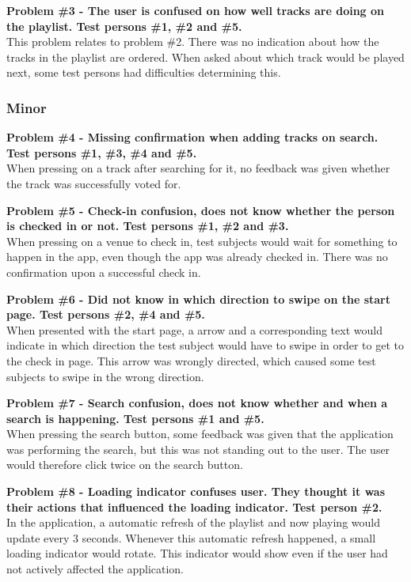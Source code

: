 \noindent\textbf{Problem \#3 - The user is confused on how well tracks are doing on the
    playlist. Test persons \#1, \#2 and \#5.}\\
  This problem relates to problem \#2. There was no indication about
  how the tracks in the playlist are ordered. When asked about which
  track would be played next, some test persons had difficulties
  determining this.

\subsubsection{Minor}
\textbf{Problem \#4 - Missing confirmation when adding tracks on search. Test persons
    \#1, \#3, \#4 and \#5.}\\
  When pressing on a track after searching for it, no feedback was
  given whether the track was successfully voted for.

\noindent\textbf{Problem \#5 - Check-in confusion, does not know whether the person is checked
    in or not. Test persons \#1, \#2 and \#3.}\\
  When pressing on a venue to check in, test subjects would wait for
  something to happen in the app, even though the app was already
  checked in. There was no confirmation upon a successful check in.

\noindent\textbf{Problem \#6 - Did not know in which direction to swipe on the start page. Test
    persons \#2, \#4 and \#5.}\\
  When presented with the start page, a arrow and a corresponding text
  would indicate in which direction the test subject would have to
  swipe in order to get to the check in page. This arrow was wrongly
  directed, which caused some test subjects to swipe in the wrong direction.

\noindent\textbf{Problem \#7 - Search confusion, does not know whether and when a search is
    happening. Test persons \#1 and \#5.}\\
  When pressing the search button, some feedback was given that the
  application was performing the search, but this was not standing out
  to the user. The user would therefore click twice on the search button.

\noindent\textbf{Problem \#8 - Loading indicator confuses user. They thought it was their actions
    that influenced the loading indicator. Test person \#2.}\\
  In the application, a automatic refresh of the playlist and
  now playing would update every 3 seconds. Whenever this automatic
  refresh happened, a small loading indicator would rotate. This
  indicator would show even if the user had not actively affected the application.

